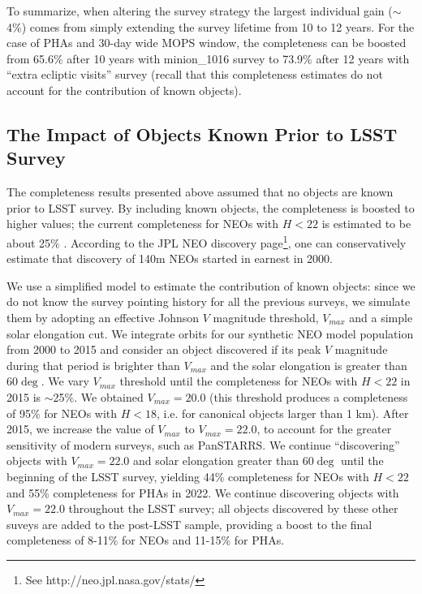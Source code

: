 To summarize, when altering the survey strategy the largest individual gain ($\sim$4\%)
comes from simply extending the survey lifetime from 10 to 12 years. For the case of PHAs and 30-day wide MOPS window,
the completeness can be boosted from 65.6\% after 10 years with minion\_1016 survey to 73.9\% after 12 years with
``extra ecliptic visits'' survey (recall that this completeness estimates do not account for the contribution of known objects).


\subsection{The Impact of Objects Known Prior to LSST Survey \label{sec:known}}

The completeness results presented above assumed that no objects are known prior to LSST survey.
By including known objects, the completeness is boosted to higher values; the current completeness
for NEOs with $H<22$ is estimated to be about 25\% \citep{GMS2016}. According to the JPL NEO
discovery page\footnote{See http://neo.jpl.nasa.gov/stats/}, one can conservatively estimate that
discovery of 140m NEOs started in earnest in 2000.

We use a simplified model to estimate the contribution of known objects: since we do not know the
survey pointing history for all the previous surveys, we simulate them by adopting an effective
Johnson $V$ magnitude threshold, $V_{max}$ and a simple solar elongation cut.
We integrate orbits for our synthetic NEO model
population from 2000 to 2015 and consider an object discovered if its peak $V$ magnitude
during that period is brighter than $V_{max}$ and the solar elongation is greater than $60\deg$. 
We vary $V_{max}$ threshold until the completeness
for NEOs with $H<22$ in 2015 is $\sim$25\%. We obtained $V_{max}=20.0$ (this threshold
produces a completeness of 95\% for NEOs with $H<18$, i.e. for canonical objects larger than 1 km).
After 2015, we increase the value of $V_{max}$ to $V_{max}=22.0$, to account for the greater sensitivity
of modern surveys, such as PanSTARRS. We continue ``discovering'' objects with $V_{max}=22.0$ and solar elongation
greater than $60\deg$ until the beginning of the LSST survey, yielding 44\% completeness for NEOs 
with $H<22$ and 55\% completeness for PHAs in 2022. We continue discovering objects with $V_{max}=22.0$ throughout
the LSST survey; all objects discovered by these other suveys are added to the post-LSST sample, providing
a boost to the final completeness of 8-11\% for NEOs and 11-15\% for PHAs.

